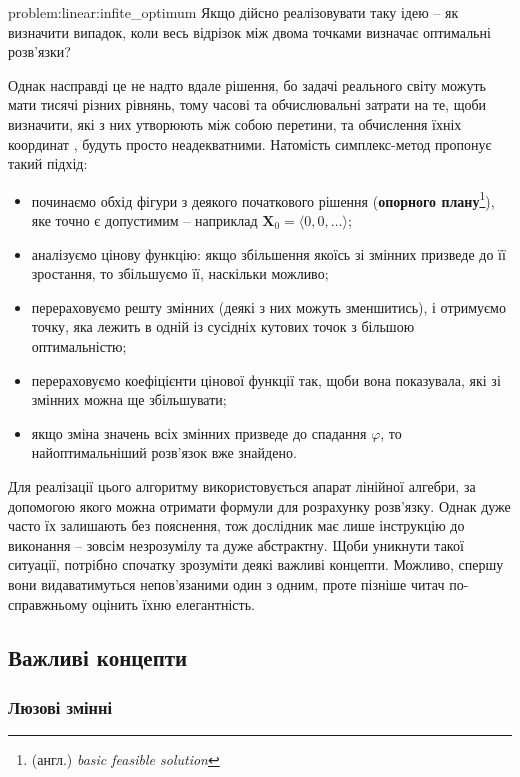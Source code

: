 \documentclass[\main/book.tex]{subfiles}
\begin{document}
\begin{problem}{problem:linear:infite_optimum}
 Якщо дійсно реалізовувати таку ідею -- як визначити випадок, коли весь відрізок між двома точками визначає оптимальні розв'язки?
\end{problem}

Однак насправді це не надто вдале рішення, бо задачі \flqq{}реального світу\frqq{} можуть мати тисячі різних рівнянь, тому часові та обчислювальні затрати на те, щоби визначити, які з них утворюють між собою перетини, та обчислення їхніх координат
, будуть просто неадекватними. Натомість симплекс-метод пропонує такий підхід:

\begin{itemize}
 \item починаємо обхід фігури з деякого початкового рішення (\textbf{опорного плану}\footnote{(англ.) \textit{basic feasible solution}}), яке точно є допустимим -- наприклад $\mathbf{X}_0 = {\langle 0, 0, \ldots \rangle}$;
 \item аналізуємо цінову функцію: якщо збільшення якоїсь зі змінних призведе до її зростання, то збільшуємо її, наскільки можливо;
 \item перераховуємо решту змінних (деякі з них можуть зменшитись), і отримуємо точку, яка лежить в одній із сусідніх кутових точок з більшою оптимальністю;
 \item перераховуємо коефіцієнти цінової функції так, щоби вона показувала, які зі змінних можна ще збільшувати;
 \item якщо зміна значень всіх змінних призведе до спадання $\varphi$, то найоптимальніший розв'язок вже знайдено.
\end{itemize}

Для реалізації цього алгоритму використовується апарат лінійної алгебри, за допомогою якого можна отримати формули для розрахунку розв'язку. Однак дуже часто їх залишають без пояснення, тож дослідник має лише інструкцію до виконання -- зовсім незрозумілу та дуже абстрактну. Щоби уникнути такої ситуації, потрібно спочатку зрозуміти деякі важливі концепти. Можливо, спершу вони видаватимуться непов'язаними один з одним, проте пізніше читач по-справжньому оцінить їхню елегантність.

\subsection{Важливі концепти}

\subsubsection{Люзові змінні}
\end{document}
